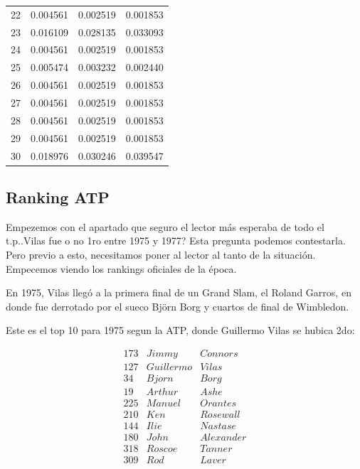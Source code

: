 \begin{table}[]
\begin{tabular}{llll}
22       & 0.004561          & 0.002519           & 0.001853           \\
23       & 0.016109          & 0.028135           & 0.033093           \\
24       & 0.004561          & 0.002519           & 0.001853           \\
25       & 0.005474          & 0.003232           & 0.002440           \\
26       & 0.004561          & 0.002519           & 0.001853           \\
27       & 0.004561          & 0.002519           & 0.001853           \\
28       & 0.004561          & 0.002519           & 0.001853           \\
29       & 0.004561          & 0.002519           & 0.001853           \\
30       & 0.018976          & 0.030246           & 0.039547           \\ \hline
\end{tabular}
\end{table}

\subsection{Ranking ATP}

Empezemos con el apartado que seguro el lector más esperaba de todo el t.p..Vilas fue o no 1ro entre 1975 y 1977? Esta pregunta podemos contestarla. Pero previo a esto, necesitamos poner al lector al tanto de la situación. Empecemos viendo los rankings oficiales de la época.


En 1975, Vilas llegó a la primera final de un Grand Slam, el Roland Garros, en donde fue derrotado por el sueco Björn Borg
y cuartos de final de Wimbledon.


Este es el top 10 para 1975 segun la ATP, donde Guillermo Vilas se hubica 2do:

\begin{eqnarray*}
173 & Jimmy & Connors \\
127 & Guillermo & Vilas \\
34 & Bjorn & Borg \\
19 & Arthur & Ashe \\
225 & Manuel & Orantes \\
210 & Ken & Rosewall \\
144 & Ilie & Nastase \\
180 & John & Alexander \\
318 & Roscoe & Tanner \\
309 & Rod & Laver 
\end{eqnarray*}

